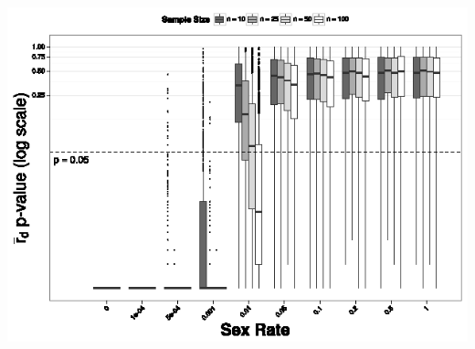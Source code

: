 \documentclass[letterpaper, 10pt]{article}
\begin{document}
\includegraphics{figures/rbarD_pval.eps}\\
\end{document}
